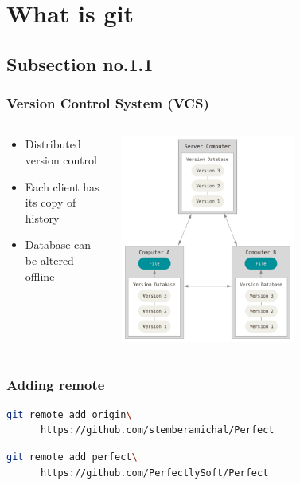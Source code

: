 \documentclass[hyperref={pdfpagelabels=false}]{beamer}
\begin{document}
\section{What is git} 
\subsection{Subsection no.1.1}
\begin{frame}
\frametitle{Version Control System (VCS)}
\begin{columns}
\begin{column}{0.4\textwidth}
	\begin{itemize}
		\item Distributed version control
		\item Each client has its copy of history
		\item Database can be altered offline
	\end{itemize}
\end{column}
\begin{column}{0.6\textwidth}  %
    \begin{center}
     \includegraphics[width=0.6\textwidth]{distributed}
     \end{center}
\end{column} 
\end{columns}
\end{frame}

\begin{frame}[fragile]
\frametitle{Adding remote}
	\begin{lstlisting}[language=bash, caption={Add remote called origin}]
	git remote add origin\
	  https://github.com/stemberamichal/Perfect
	\end{lstlisting}
	
	\begin{lstlisting}[language=bash, caption={Add another remote}]
	git remote add perfect\
	  https://github.com/PerfectlySoft/Perfect
	\end{lstlisting}
\end{frame}
\end{document}
